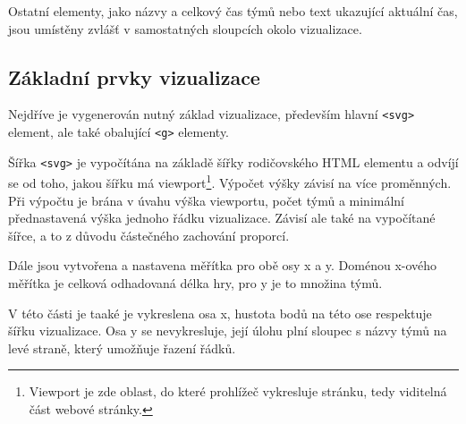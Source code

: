 \documentclass[
  digital, %
  oneside, %
  table,   %
  nolof,     %
  nolot,     %
]{fithesis3}
\begin{document}
Ostatní elementy, jako názvy a celkový čas týmů nebo text ukazující aktuální čas, jsou umístěny zvlášť v samostatných sloupcích okolo vizualizace.

\subsection{Základní prvky vizualizace}
Nejdříve je vygenerován nutný základ vizualizace, především hlavní \verb|<svg>| element, ale také obalující \verb|<g>| elementy.\par
Šířka \verb|<svg>| je vypočítána na základě šířky rodičovského HTML elementu a odvíjí se od toho, jakou šířku má viewport\footnote{Viewport je zde oblast, do které prohlížeč vykresluje stránku, tedy viditelná část webové stránky.}. Výpočet výšky závisí na více proměnných. Při výpočtu je brána v úvahu výška viewportu, počet týmů a minimální přednastavená výška jednoho řádku vizualizace. Závisí ale také na vypočítané šířce, a to z důvodu částečného zachování proporcí.\par
Dále jsou vytvořena a nastavena měřítka pro obě osy x a y. Doménou x-ového měřítka je celková odhadovaná délka hry, pro y je to množina týmů.\par
V této části je taaké je vykreslena osa x, hustota bodů na této ose respektuje šířku vizualizace. Osa y se nevykresluje, její úlohu plní sloupec s názvy týmů na levé straně, který umožňuje řazení řádků.
\end{document}

